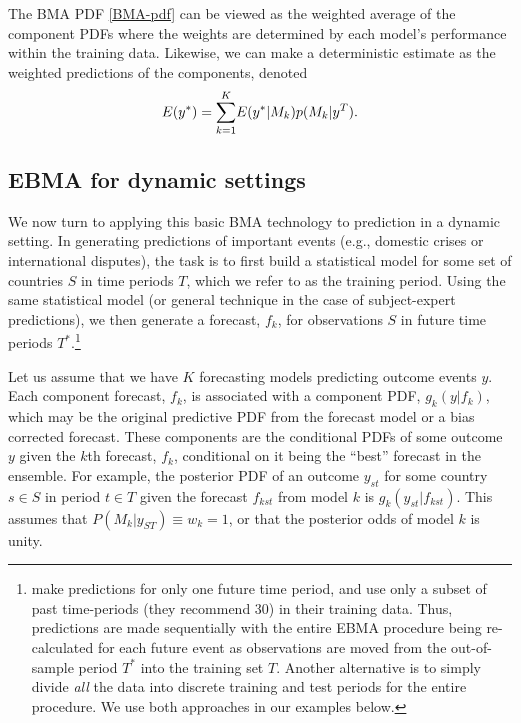 \documentclass[pdftex,12pt,fullpage,oneside]{amsart}
\begin{document}
The BMA PDF \eqref{BMA-pdf} can be viewed as the weighted average of
the component PDFs where the weights are determined by each model's
performance within the training data.  Likewise, we can make a
deterministic estimate as the weighted predictions of the components,
denoted
\begin{equation} \small
E(y^*) = \underset{k=1}{\overset{K}{\sum}} E(y^*|M_k)p(M_k|y^T).
\end{equation}

\subsection{EBMA for dynamic settings}

We now turn to applying this basic BMA technology to prediction in a
dynamic setting.  In generating predictions of important events (e.g.,
domestic crises or international disputes), the task is to first build
a statistical model for some set of countries $S$ in time periods $T$,
which we refer to as the training period.  Using the same statistical
model (or general technique in the case of subject-expert
predictions), we then generate a forecast, $f_k$, for observations $S$
in future time periods $T^*$.\footnote{\citet{Sloughter:2007} make
  predictions for only one future time period, and use only a subset
  of past time-periods (they recommend 30) in their training
  data. Thus, predictions are made sequentially with the entire EBMA
  procedure being re-calculated for each future event as observations
  are moved from the out-of-sample period $T^*$ into the training set
  $T$. Another alternative is to simply divide \textit{all} the data
  into discrete training and test periods for the entire procedure.
  We use both approaches in our examples below.} 

Let us assume that we have $K$ forecasting models predicting outcome
events $y$. Each component forecast, $f_k$, is associated with a
component PDF, $g_k(y|f_k)$, which may be the original predictive PDF
from the forecast model or a bias corrected forecast.  These
components are the conditional PDFs of some outcome $y$ given the
$k$th forecast, $f_k$, conditional on it being the ``best'' forecast
in the ensemble. For example, the posterior PDF of an outcome $y_{st}$
for some country $s \in S$ in period $t \in T$ given the forecast
$f_{kst}$ from model $k$ is $g_k(y_{st}|f_{kst})$. This assumes that
$P(M_k | y_{ST}) \equiv w_k=1$, or that the posterior odds of model
$k$ is unity.
\end{document}
